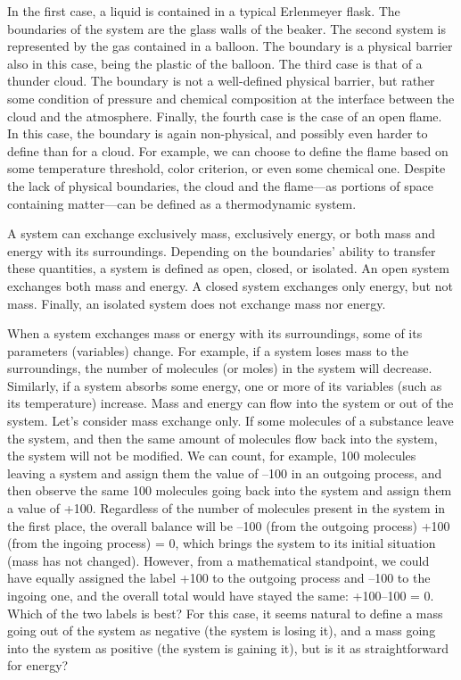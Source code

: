 \documentclass[
  9pt,
]{extbook}
\theoremstyle{definition}
\theoremstyle{definition}
\theoremstyle{definition}
\theoremstyle{remark}
\begin{document}
In the first case, a liquid is contained in a typical Erlenmeyer flask. The boundaries of the system are the glass walls of the beaker. The second system is represented by the gas contained in a balloon. The boundary is a physical barrier also in this case, being the plastic of the balloon. The third case is that of a thunder cloud. The boundary is not a well-defined physical barrier, but rather some condition of pressure and chemical composition at the interface between the cloud and the atmosphere. Finally, the fourth case is the case of an open flame. In this case, the boundary is again non-physical, and possibly even harder to define than for a cloud. For example, we can choose to define the flame based on some temperature threshold, color criterion, or even some chemical one. Despite the lack of physical boundaries, the cloud and the flame---as portions of space containing matter---can be defined as a thermodynamic system.

A system can exchange exclusively mass, exclusively energy, or both mass and energy with its surroundings. Depending on the boundaries' ability to transfer these quantities, a system is defined as open, closed, or isolated. An open system exchanges both mass and energy. A closed system exchanges only energy, but not mass. Finally, an isolated system does not exchange mass nor energy.

When a system exchanges mass or energy with its surroundings, some of its parameters (variables) change. For example, if a system loses mass to the surroundings, the number of molecules (or moles) in the system will decrease. Similarly, if a system absorbs some energy, one or more of its variables (such as its temperature) increase. Mass and energy can flow into the system or out of the system. Let's consider mass exchange only. If some molecules of a substance leave the system, and then the same amount of molecules flow back into the system, the system will not be modified. We can count, for example, 100 molecules leaving a system and assign them the value of --100 in an outgoing process, and then observe the same 100 molecules going back into the system and assign them a value of +100. Regardless of the number of molecules present in the system in the first place, the overall balance will be --100 (from the outgoing process) +100 (from the ingoing process) = 0, which brings the system to its initial situation (mass has not changed). However, from a mathematical standpoint, we could have equally assigned the label +100 to the outgoing process and --100 to the ingoing one, and the overall total would have stayed the same: +100--100 = 0. Which of the two labels is best? For this case, it seems natural to define a mass going out of the system as negative (the system is losing it), and a mass going into the system as positive (the system is gaining it), but is it as straightforward for energy?
\end{document}

